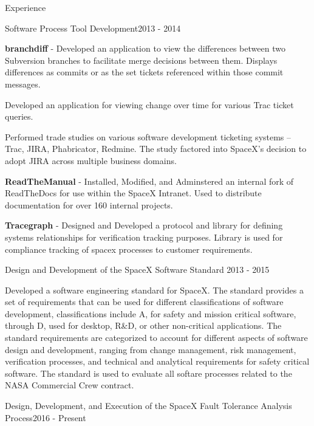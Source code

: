\documentclass{resume} %
\begin{document}
\begin{rSection}{Experience}
\begin{rSubsection}{Software Process Tool Development}{2013 - 2014}{}{}
\item \textbf{branchdiff} - Developed an application to view the differences
  between two Subversion branches to facilitate merge decisions
  between them. Displays differences as commits or as the set tickets
  referenced within those commit messages.
\item Developed an application for viewing change over time for various Trac
  ticket queries.
\item Performed trade studies on various software development ticketing systems
  -- Trac, JIRA, Phabricator, Redmine. The study factored into
  SpaceX's decision to adopt JIRA across multiple business domains.
\item \textbf{ReadTheManual} - Installed, Modified, and Adminstered an internal
  fork of ReadTheDocs for use within the SpaceX Intranet. Used to
  distribute documentation for over 160 internal projects.
\item \textbf{Tracegraph} - Designed and Developed a protocol and
  library for defining systems relationships for verification tracking
  purposes. Library is used for compliance tracking of spacex
  processes to customer requirements.

\end{rSubsection}




\begin{rSubsection}{Design and Development of the SpaceX Software Standard} {2013 - 2015}{}{}

\item Developed a software engineering standard for SpaceX. The
  standard provides a set of requirements that can be used for
  different classifications of software development, classifications
  include A, for safety and mission critical software, through D, used
  for desktop, R\&D, or other non-critical applications. The standard
  requirements are categorized to account for different aspects of
  software design and development, ranging from change management,
  risk management, verification processes, and technical and
  analytical requirements for safety critical software. The standard
  is used to evaluate all softare processes related to the NASA
  Commercial Crew contract.

\end{rSubsection}


\begin{rSubsection}{Design, Development, and Execution of the SpaceX Fault Tolerance Analysis Process}{2016 - Present}{}


\end{rSubsection}
\end{rSection}
\end{document}
